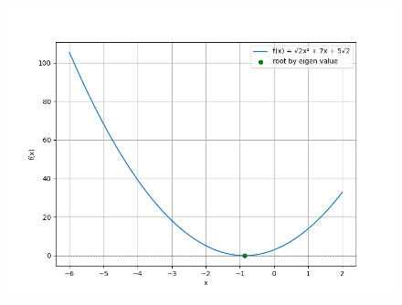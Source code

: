 \documentclass[journal]{IEEEtran}
\numberwithin{equation}{enumi}
\numberwithin{figure}{enumi}
\begin{document}
\begin{figure}[h!]
   \centering
   \includegraphics[width=0.7\linewidth]{figs/fig.png}
\end{figure}
\end{document}
